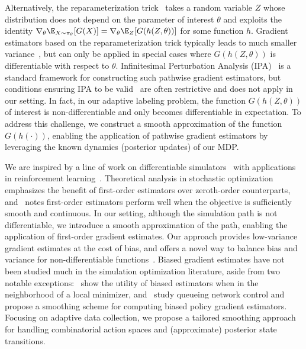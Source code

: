 Alternatively, the reparameterization trick~\citep{MaddisonMnTe17,JangGuPo17, PaulusMaKr21} 
takes a random variable $Z$ whose distribution does not depend on the parameter of interest $\theta$ and 
exploits the identity
$\nabla_\theta \E_{X \sim \pi_\theta}[G(X)]
= \nabla_\theta \E_{Z}[G(h(Z, \theta))]$ for some function $h$.
 Gradient estimators based on the reparameterization trick 
 typically leads to much smaller
variance~\citep{MohamedRoFiMn20}, 
but can only be applied in special cases where $G(h(Z, \theta))$ is differentiable with respect to $\theta$.  
Infinitesimal Perturbation Analysis (IPA)~\citep{HoEyCh83, JohnsonJa89,Glasserman90} 
is a standard framework for constructing such pathwise gradient estimators, but conditions ensuring IPA to be valid~\citep{Cao85,HeidelbergerCaZaMiSu88,Glasserman90, Glasserman92} 
are often restrictive  and does not apply in our setting. 
In fact, in our adaptive labeling problem, the function $G(h(Z, \theta))$ of interest
is non-differentiable and only becomes differentiable in expectation.
To address this challenge, we construct a smooth approximation of the function $G(h(\cdot))$, enabling the application of pathwise gradient estimators by leveraging the known dynamics (posterior updates) of our MDP.

We are inspired  by a line of work on differentiable 
simulators~\citep{deAvilaFiSmAlTeKl18,HuangHuDuZhSuTeGa21,MoraAnHaVeCo21, XuMaNaRaMaGaMa21,SuhSiZhTe22} with applications in reinforcement learning~\citep{MoraAnHaVeCo21, XuMaNaRaMaGaMa21,MadekaToEiLuFoKa22, AlvoRuKa23}.
Theoretical analysis in stochastic optimization~\citep{GhadimiLa13, MohamedRoFiMn20} emphasizes the benefit of first-order estimators over
zeroth-order counterparts, and~\citet{SuhSiZhTe22} notes first-order estimators
perform well when the objective is sufficiently smooth and continuous. 
In our setting, although the simulation path is not differentiable, we introduce a smooth approximation of the path, enabling the application of first-order gradient estimates.
Our approach provides low-variance gradient estimates at the cost of bias, and  offers a novel way to balance bias and variance for non-differentiable functions~\citep{BengioLeCo13, JangGuPo17, TuckerMnMaLaSo17}.
Biased gradient estimates have not been studied much in the simulation optimization literature, 
aside from two notable exceptions:~\citet{EckmanHe20} show the utility of biased estimators when in the neighborhood of a local minimizer, and~\citet{CheDoNa24} study queueing network control and propose a smoothing scheme for computing biased policy gradient estimators. Focusing on adaptive data collection, we propose a tailored smoothing approach for  handling combinatorial action spaces and (approximate) posterior state transitions. 
